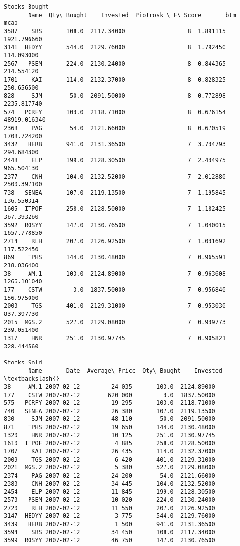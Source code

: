 \documentclass[11pt]{article}
\begin{document}
\begin{Verbatim}[commandchars=\\\{\}]
Stocks Bought
       Name  Qty\_Bought    Invested  Piotroski\_F\_Score       btm          mcap
3587    SBS       108.0  2117.34000                  8  1.891115   1921.796660
3141  HEDYY       544.0  2129.76000                  8  1.792450    114.093000
2567   PSEM       224.0  2130.24000                  8  0.844365    214.554120
1701    KAI       114.0  2132.37000                  8  0.828325    250.656500
828     SJM        50.0  2091.50000                  8  0.772898   2235.817740
574   PCRFY       103.0  2118.71000                  8  0.676154  48919.016340
2368    PAG        54.0  2121.66000                  8  0.670519   1708.724200
3432   HERB       941.0  2131.36500                  7  3.734793    294.684300
2448    ELP       199.0  2128.30500                  7  2.434975    965.504130
2377    CNH       104.0  2132.52000                  7  2.012880   2500.397100
738   SENEA       107.0  2119.13500                  7  1.195845    136.550314
1605  ITPOF       258.0  2128.50000                  7  1.182425    367.393260
3592  ROSYY       147.0  2130.76500                  7  1.040015   1657.778850
2714    RLH       207.0  2126.92500                  7  1.031692    117.522450
869    TPHS       144.0  2130.48000                  7  0.965591    218.036400
38     AM.1       103.0  2124.89000                  7  0.963608   1266.101040
177    CSTW         3.0  1837.50000                  7  0.956840    156.975000
2003    TGS       401.0  2129.31000                  7  0.953030    837.397730
2015  MGS.2       527.0  2129.08000                  7  0.939773    239.051400
1317    HNR       251.0  2130.97745                  7  0.905821    328.444560

Stocks Sold
       Name       Date  Average\_Price  Qty\_Bought    Invested  \textbackslash{}
38     AM.1 2007-02-12         24.035       103.0  2124.89000
177    CSTW 2007-02-12        620.000         3.0  1837.50000
575   PCRFY 2007-02-12         19.295       103.0  2118.71000
740   SENEA 2007-02-12         26.380       107.0  2119.13500
830     SJM 2007-02-12         48.110        50.0  2091.50000
871    TPHS 2007-02-12         19.650       144.0  2130.48000
1320    HNR 2007-02-12         10.125       251.0  2130.97745
1610  ITPOF 2007-02-12          4.885       258.0  2128.50000
1707    KAI 2007-02-12         26.435       114.0  2132.37000
2009    TGS 2007-02-12          6.420       401.0  2129.31000
2021  MGS.2 2007-02-12          5.380       527.0  2129.08000
2374    PAG 2007-02-12         24.200        54.0  2121.66000
2383    CNH 2007-02-12         34.445       104.0  2132.52000
2454    ELP 2007-02-12         11.845       199.0  2128.30500
2573   PSEM 2007-02-12         10.020       224.0  2130.24000
2720    RLH 2007-02-12         11.550       207.0  2126.92500
3147  HEDYY 2007-02-12          3.775       544.0  2129.76000
3439   HERB 2007-02-12          1.500       941.0  2131.36500
3594    SBS 2007-02-12         34.450       108.0  2117.34000
3599  ROSYY 2007-02-12         46.750       147.0  2130.76500


\end{Verbatim}
\end{document}
